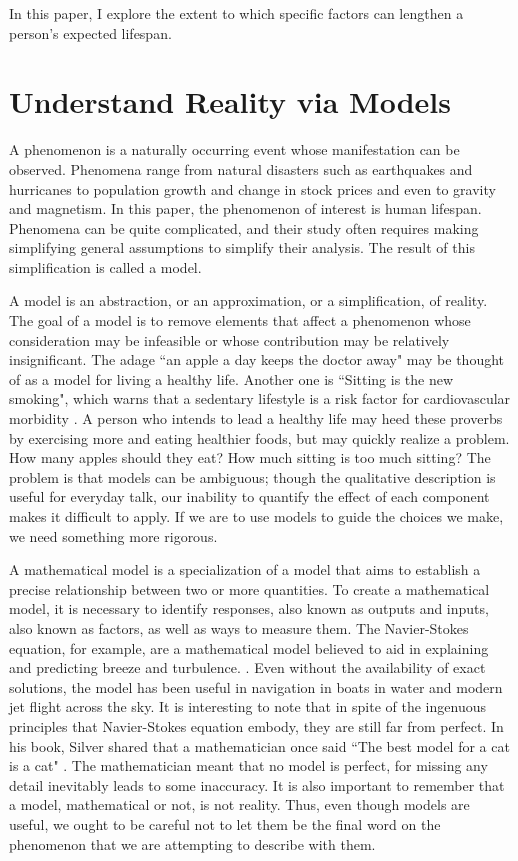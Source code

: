 \documentclass[12pt]{article}
\begin{document}
	In this paper, I explore the extent to which specific factors can
	lengthen a person's expected lifespan.
	\section{Understand Reality via Models}
	A phenomenon is a naturally occurring event whose manifestation can be observed.
	Phenomena range from natural disasters such as earthquakes and hurricanes to
	population growth and change in stock prices and even to gravity and magnetism.
	In this paper, the phenomenon of interest is human lifespan. Phenomena can
	be quite complicated, and their study often requires making simplifying general
	assumptions to simplify their analysis. The result of this simplification is
	called a model.
	
	A model is an abstraction, or an approximation, or a simplification, of reality.
	The goal of a model is to remove elements that affect a phenomenon whose consideration
	may be infeasible or whose contribution may be relatively insignificant.
	The adage ``an apple a day keeps the doctor away" may be thought of as a model
	for living a healthy life. Another one is ``Sitting is the new smoking",
	which warns that a sedentary lifestyle is a risk factor for cardiovascular
	morbidity \cite{NLoM-sitting-smoking}. A person who intends to lead a healthy
	life may heed these proverbs by exercising more and eating healthier foods,
	but may quickly realize a problem. How many apples should they eat? How
	much sitting is too much sitting? The problem is that models can be ambiguous;
	though the qualitative description is useful for everyday talk, our inability
	to quantify the effect of each component makes it difficult to apply. If we are to
	use models to guide the choices we make, we need something more rigorous.
	
	A mathematical model is a specialization of a model that aims to establish a
	precise relationship between two or more quantities. To create a mathematical model,
	it is necessary to identify responses, also known as outputs and inputs, also known
	as factors, as well as ways to measure them. The Navier-Stokes equation, for example, 
	are a mathematical model believed to aid in explaining and predicting breeze and turbulence.
	\cite{Clay-navier-stokes}. Even without the availability of exact solutions, the model has
	been useful in navigation in boats in water and modern jet flight across the sky.
	It is interesting to note that in spite of the ingenuous principles
	that Navier-Stokes equation embody, they are still far from perfect.
	In his book, Silver shared that a mathematician once said ``The best model for a cat is a cat"
	\cite{Silver-signal-and-noise}. The mathematician meant that no model is perfect, for
	missing any detail inevitably leads to some inaccuracy. It is also important
	to remember that a model, mathematical or not, is not reality. Thus, even though
	models are useful, we ought to be careful not to let them be the final word on
	the phenomenon that we are attempting to describe with them.
	
\end{document}
